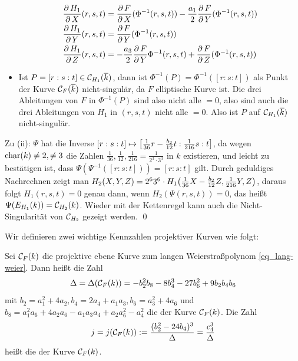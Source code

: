 \begin{bew}
\begin{itemize}
		\begin{equation}
		\begin{aligned}
			\frac{\der H_1}{\der X}(r,s,t) &= \frac{\der F}{\der X}(\Phi^{-1}(r,s,t)) - \frac{a_1}{2} \frac{\der F}{\der Y}(\Phi^{-1}(r,s,t)) \\
			\frac{\der H_1}{\der Y}(r,s,t) &= \frac{\der F}{\der Y} (\Phi^{-1}(r,s,t)) \\
			\frac{\der H_1}{\der Z}(r,s,t) &= -\frac{a_3}{2} \frac{\der F}{\der Y} \Phi^{-1}(r,s,t) + \frac{\der F}{\der Z}(\Phi^{-1}(r,s,t))
		\end{aligned}
		\end{equation}
		\item Ist $P = [r:s:t] \in \cc_{H_1}(\overline{k})$, dann ist $\Phi^{-1}(P) = \Phi^{-1}([r:s:t])$ als Punkt der Kurve $\cc_F(\overline{k})$ nicht-singulär, da $F$ elliptische Kurve ist. 
		Die drei Ableitungen von $F$ in $\Phi^{-1}(P)$ sind also nicht alle $= 0$, also sind auch die drei Ableitungen von $H_1$ in $(r,s,t)$ nicht alle $=0$. 
		Also ist $P$ auf $\cc_{H_1}(\overline{k})$ nicht-singulär.
	\end{itemize}
	Zu (ii): $\Psi$ hat die Inverse $[r:s:t] \mapsto \benbrace*{\frac{1}{36} r - \frac{b_2}{12}t : \frac{1}{216} s : t}$, da wegen $\Char(k) \neq 2, \neq 3$ die Zahlen $\frac{1}{36}, \frac{1}{12}, \frac{1}{216} = \frac{1}{2^3 \cdot 3^3}$ in $k$ existieren, und leicht zu bestätigen ist, dass $\Psi(\Psi^{-1}([r:s:t])) = [r:s:t]$ gilt. 
	Durch geduldiges Nachrechnen zeigt man $H_2(X,Y,Z) = 2^6 3^6 \cdot H_1 \enbrace*{\frac{1}{36} X - \frac{b_2}{12}Z, \frac{1}{216} Y,Z}$, daraus folgt $H_1(r,s,t) = 0$ genau dann, wenn $H_2(\Psi(r,s,t))=0$, das heißt $\Psi(E_{H_1}(k)) = \cc_{H_2}(k)$. 
	Wieder mit der Kettenregel kann auch die Nicht-Singularität von $\cc_{H_2}$ gezeigt werden. \qed
\end{bew}

Wir definieren zwei wichtige Kennzahlen projektiver Kurven wie folgt:
\begin{defn}
	Sei $\cc_F(k)$ die projektive ebene Kurve zum langen Weierstraßpolynom \eqref{eq_lang-weier}. 
	Dann heißt die Zahl
	\[ 
	\Delta = \Delta(\cc_F(k)) = -b_2^2 b_8 - 8b_4^3 - 27b_6^2 + 9b_2b_4b_6
	\]
	mit $b_2 = a_1^2 + 4a_2, b_4 = 2a_4 + a_1 a_3, b_6 = a_3^2 + 4a_6$ und $b_8 = a_1^2 a_6 + 4a_2 a_6 - a_1a_3a_4 + a_2 a_6^2 - a_4^2$ die  der Kurve $\cc_F(k)$. 
	Die Zahl 
	\[ j = j(\cc_F(k)) := \frac{(b_2^2 - 24b_4)^3}{\Delta} = \frac{c_4^3}{\Delta} \]
	heißt die  der Kurve $\cc_F(k)$. 
\end{defn}

